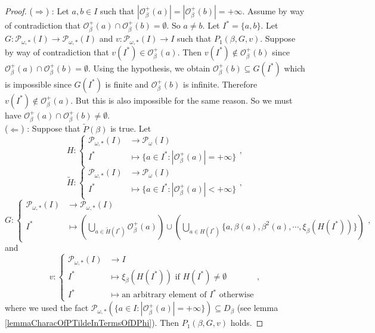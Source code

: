 \documentclass[a4paper,11pt]{article}
\theoremstyle{plain}
\theoremstyle{definition}
\theoremstyle{remark}
\begin{document}
\begin{proof}
($\Rightarrow$) : Let $a,b \in I$ such that $|\mathcal{O}^{+}_\beta(a)| = |\mathcal{O}^{+}_\beta(b)| = +\infty$. Assume by way of contradiction that $\mathcal{O}^{+}_\beta(a) \cap \mathcal{O}^{+}_\beta(b) = \emptyset$. So $a \neq b$. Let $I^* = \{a,b\}$. Let $G : \mathcal{P}_{\omega,*}(I) \to \mathcal{P}_{\omega,*}(I)$ and $v : \mathcal{P}_{\omega,*}(I) \to I$ such that $P_1(\beta,G,v)$. Suppose by way of contradiction that $v(I^*) \in \mathcal{O}^{+}_\beta(a)$. Then $v(I^*) \notin \mathcal{O}^{+}_\beta(b)$ since $\mathcal{O}^{+}_\beta(a) \cap \mathcal{O}^{+}_\beta(b) = \emptyset$. Using the hypothesis, we obtain $\mathcal{O}^{+}_\beta(b) \subseteq G(I^*)$ which is impossible since $G(I^*)$ is finite and $\mathcal{O}^{+}_\beta(b)$ is infinite. Therefore $v(I^*) \notin \mathcal{O}^{+}_\beta(a)$. But this is also impossible for the same reason. So we must have $\mathcal{O}^{+}_\beta(a) \cap \mathcal{O}^{+}_\beta(b) \neq \emptyset$. \\
($\Leftarrow$) : Suppose that $\widetilde{P}(\beta)$ is true. Let
\[ H : \begin{cases} \mathcal{P}_{\omega,*}(I) &\to \mathcal{P}_{\omega}(I)  \\ I^* &\mapsto \{a \in I^* : |\mathcal{O}^{+}_\beta(a)| = +\infty \} \end{cases}, \]
\[ \widetilde{H} : \begin{cases} \mathcal{P}_{\omega,*}(I) &\to \mathcal{P}_{\omega}(I)  \\ I^* &\mapsto \{a \in I^* : |\mathcal{O}^{+}_\beta(a)| < +\infty \} \end{cases}, \]
\[ G : \begin{cases} \mathcal{P}_{\omega,*}(I) &\to \mathcal{P}_{\omega,*}(I) \\ I^* &\mapsto \left( \bigcup_{a \in \widetilde{H}(I^*)} \mathcal{O}^{+}_\beta(a) \right) \cup \left( \bigcup_{a \in H(I^*)} \{a, \beta(a), \beta^2(a), \cdots, \xi_\beta(H(I^*))\} \right) \end{cases}, \]
and 
\[ v : \begin{cases} \mathcal{P}_{\omega,*}(I) &\to I \\ I^* &\mapsto \xi_\beta(H(I^*)) \text{ if } H(I^*) \neq \emptyset \\ I^* &\mapsto \text{an arbitrary element of } I^* \text{ otherwise} \end{cases}, \]
where we used the fact $\mathcal{P}_{\omega,*}(\{a \in I : |\mathcal{O}^{+}_\beta(a)|=+\infty\}) \subseteq D_\beta$ (see lemma \ref{lemmaCharacOfPTildeInTermsOfDPhi}). Then $P_1(\beta,G,v)$ holds.
\end{proof}
\end{document}
